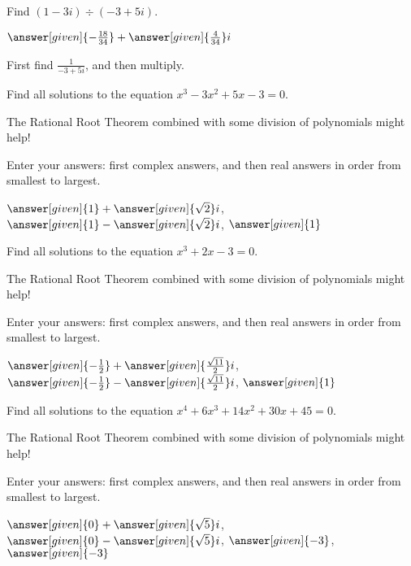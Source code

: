 \documentclass[nooutcomes]{ximera}
\begin{document}
\begin{problem}
Find $(1-3i) \div (-3+5i)$.
\begin{prompt}
	$\answer[given]{-\frac{18}{34}} + \answer[given]{\frac{4}{34}}i$
\end{prompt}
\begin{hint}
First find $\frac{1}{-3+5i}$, and then multiply.
\end{hint}
\end{problem}



\begin{problem}
Find all solutions to the equation $x^3-3x^2+5x-3=0$. 
\begin{hint} 
The Rational Root Theorem combined with some division of polynomials might help!
\end{hint}
Enter your answers: first complex answers, and then real answers in order from smallest to largest.

\begin{prompt}
$\answer[given]{1} + \answer[given]{\sqrt{2}}i$, $\answer[given]{1} - \answer[given]{\sqrt{2}}i$, $\answer[given]{1}$
\end{prompt}
\end{problem}


\begin{problem}
Find all solutions to the equation $x^3+2x-3=0$. 
\begin{hint} 
The Rational Root Theorem combined with some division of polynomials might help!
\end{hint}
Enter your answers: first complex answers, and then real answers in order from smallest to largest.

\begin{prompt}
$\answer[given]{-\frac{1}{2}} + \answer[given]{\frac{\sqrt{11}}{2}}i$, $\answer[given]{-\frac{1}{2}} - \answer[given]{\frac{\sqrt{11}}{2}}i$, $\answer[given]{1}$
\end{prompt}
\end{problem}


\begin{problem}
Find all solutions to the equation $x^4+6x^3+14x^2+30x+45=0$. 
\begin{hint} 
The Rational Root Theorem combined with some division of polynomials might help!
\end{hint}
Enter your answers: first complex answers, and then real answers in order from smallest to largest.

\begin{prompt}
$\answer[given]{0} + \answer[given]{\sqrt{5}}i$, $\answer[given]{0} - \answer[given]{\sqrt{5}}i$, $\answer[given]{-3}$, $\answer[given]{-3}$
\end{prompt}
\end{problem}
\end{document}
